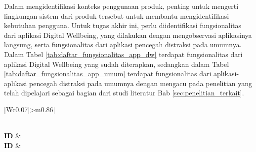 Dalam mengidentifikasi konteks penggunaan produk, penting untuk mengerti lingkungan sistem dari produk tersebut untuk membantu mengidentifikasi kebutuhan pengguna. Untuk tugas akhir ini, perlu diidentifikasi fungsionalitas dari aplikasi Digital Wellbeing, yang dilakukan dengan mengobservasi aplikasinya langsung, serta fungsionalitas dari aplikasi pencegah distraksi pada umumnya. Dalam Tabel \ref{tab:daftar_fungsionalitas_app_dw} terdapat fungsionalitas dari aplikasi Digital Wellbeing yang sudah diterapkan, sedangkan dalam Tabel \ref{tab:daftar_fungsionalitas_app_umum} terdapat fungsionalitas dari aplikasi-aplikasi pencegah distraksi pada umumnya dengan mengacu pada penelitian yang telah dipelajari sebagai bagian dari studi literatur Bab \ref{sec:penelitian_terkait}.

\RaggedLeft
\begin{footnotesize}
\begin{longtable}[c]{|W{c}{0.07\textwidth}|>{\ccnormspacing}m{0.86\textwidth}|}
  \caption{Daftar Fungsionalitas Aplikasi Digital Wellbeing}
  \label{tab:daftar_fungsionalitas_app_dw} \\
  \hline {} \textbf{ID} &  \\ \hline \endfirsthead
  \hline {} \textbf{ID} &  \\ \hline \endhead
  
  \hline \endfoot
  

\end{longtable}
\end{footnotesize}
